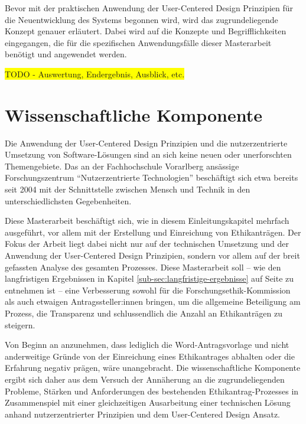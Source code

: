\documentclass[a4paper,12pt,twoside]{scrreprt}
\begin{document}
Bevor mit der praktischen Anwendung der User-Centered Design Prinzipien für die Neuentwicklung des Systems begonnen wird, wird das zugrundeliegende Konzept genauer erläutert. Dabei wird auf die Konzepte und Begrifflichkeiten eingegangen, die für die spezifischen Anwendungsfälle dieser Masterarbeit benötigt und angewendet werden.

\colorbox{yellow}{TODO - Auswertung, Endergebnis, Ausblick, etc.}

\section{Wissenschaftliche Komponente}
\label{sec:wissenschaftliche-komponente}

Die Anwendung der User-Centered Design Prinzipien und die nutzerzentrierte Umsetzung von Software-Lösungen sind an sich keine neuen oder unerforschten Themengebiete. Das an der Fachhochschule Vorarlberg ansässige Forschungszentrum \enquote{Nutzerzentrierte Technologien} beschäftigt sich etwa bereits seit 2004 mit der Schnittstelle zwischen Mensch und Technik in den unterschiedlichsten Gegebenheiten. \cite{fachhochschule_vorarlberg_gmbh_nutzerzentrierte_2021}

Diese Masterarbeit beschäftigt sich, wie in diesem Einleitungskapitel mehrfach ausgeführt, vor allem mit der Erstellung und Einreichung von Ethikanträgen. Der Fokus der Arbeit liegt dabei nicht nur auf der technischen Umsetzung und der Anwendung der User-Centered Design Prinzipien, sondern vor allem auf der breit gefassten Analyse des gesamten Prozesses. Diese Masterarbeit soll -- wie den langfristigen Ergebnissen in Kapitel \ref{sub-sec:langfristige-ergebnisse} auf Seite \pageref{sub-sec:langfristige-ergebnisse} zu entnehmen ist -- eine Verbesserung sowohl für die Forschungsethik-Kommission als auch etwaigen Antragssteller:innen bringen, um die allgemeine Beteiligung am Prozess, die Transparenz und schlussendlich die Anzahl an Ethikanträgen zu steigern.

Von Beginn an anzunehmen, dass lediglich die Word-Antragsvorlage und nicht anderweitige Gründe von der Einreichung eines Ethikantrages abhalten oder die Erfahrung negativ prägen, wäre unangebracht. Die wissenschaftliche Komponente ergibt sich daher aus dem Versuch der Annäherung an die zugrundeliegenden Probleme, Stärken und Anforderungen des bestehenden Ethikantrag-Prozesses in Zusammenspiel mit einer gleichzeitigen Ausarbeitung einer technischen Lösung anhand nutzerzentrierter Prinzipien und dem User-Centered Design Ansatz.
\end{document}
